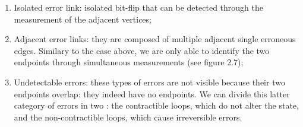 \documentclass{Configuration_Files/PoliMi3i_thesis}
\begin{document}
\begin{enumerate}
	\item Isolated error link: isolated bit-flip that can be detected through the measurement of the adjacent vertices;
	
	\item Adjacent error links: they are composed of multiple adjacent single erroneous edges. Similary to the case above, we are only able to identify the two endpoints through simultaneous measurements (see figure 2.7);
	
	\item Undetectable errors: these types of errors are not visible because their two endpoints overlap: they indeed have no endpoints. We can divide this latter category of errors in two : the contractible loops, which do not alter the state, and the non-contractible loops, which cause irreversible errors.
	
\end{enumerate}
\end{document}
